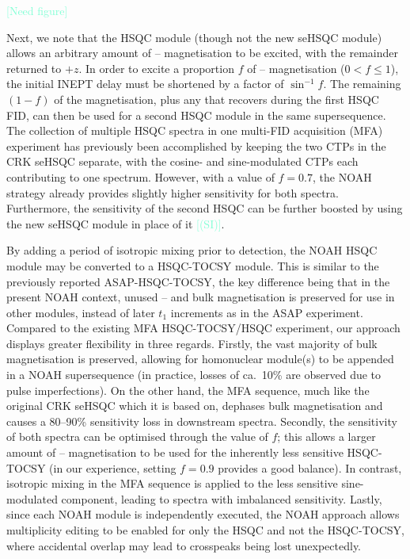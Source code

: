 \documentclass[draft,11pt]{article}
\newcommand*{\carbon}{\ce{^{13}C}}
\newcommand*{\proton}{\ce{^{1}H}}
\newcommand*{\hl}[1]{\textcolor{Aquamarine}{[#1]}}
\newcommand*{\sitodo}{\hl{(SI)}}
\begin{document}
\hl{Need figure}

Next, we note that the HSQC module (though not the new seHSQC module) allows an arbitrary amount of \carbon{}--\proton{} magnetisation to be excited, with the remainder returned to $+z$.  In order to excite a proportion $f$ of \carbon{}--\proton{} magnetisation ($0 < f \leq 1$), the initial INEPT delay must be shortened by a factor of $\sin^{-1}f$.
The remaining $(1 - f)$ of the magnetisation, plus any that recovers during the first HSQC FID, can then be used for a second HSQC module in the same supersequence.
The collection of multiple HSQC spectra in one multi-FID acquisition (MFA) experiment has previously been accomplished by keeping the two CTPs in the CRK seHSQC separate, with the cosine- and sine-modulated CTPs each contributing to one spectrum.\autocite{ctphsqc}
However, with a value of $f = 0.7$, the NOAH strategy already provides slightly higher sensitivity for both spectra.
Furthermore, the sensitivity of the second HSQC can be further boosted by using the new seHSQC module in place of it \sitodo{}.

By adding a period of isotropic mixing prior to detection, the NOAH HSQC module may be converted to a HSQC-TOCSY module.
This is similar to the previously reported ASAP-HSQC-TOCSY,\autocite{Becker2019JMR} the key difference being that in the present NOAH context, unused \carbon{}--\proton{} and bulk magnetisation is preserved for use in other modules, instead of later $t_1$ increments as in the ASAP experiment.
Compared to the existing MFA HSQC-TOCSY/HSQC experiment,\autocite{Nolis2019CPC} our approach displays greater flexibility in three regards.
Firstly, the vast majority of bulk magnetisation is preserved, allowing for homonuclear module(s) to be appended in a NOAH supersequence (in practice, losses of ca.\ 10\% are observed due to pulse imperfections).
On the other hand, the MFA sequence, much like the original CRK seHSQC which it is based on, dephases bulk magnetisation and causes a 80--90\% sensitivity loss in downstream spectra.
Secondly, the sensitivity of both spectra can be optimised through the value of $f$; this allows a larger amount of \carbon{}--\proton{} magnetisation to be used for the inherently less sensitive HSQC-TOCSY (in our experience, setting $f = 0.9$ provides a good balance).
In contrast, isotropic mixing in the MFA sequence is applied to the less sensitive sine-modulated component, leading to spectra with imbalanced sensitivity.
Lastly, since each NOAH module is independently executed, the NOAH approach allows multiplicity editing to be enabled for only the HSQC and not the HSQC-TOCSY, where accidental overlap may lead to crosspeaks being lost unexpectedly.
\end{document}
